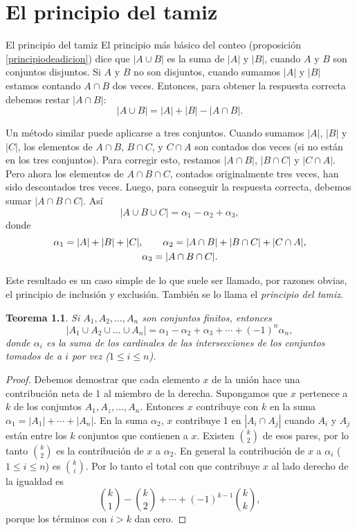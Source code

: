 \documentclass[11pt,spanish,makeidx]{amsbook}
\newtheorem{teorema}{Teorema}[section]
\theoremstyle{definition}
\theoremstyle{remark}
\begin{document}
\appendix
\setcounter{chapter}{1}
\renewcommand{\thechapter}{\Alph{chapter}}
\chapter[El principio del tamiz]{El principio del tamiz} \label{principiodeltamiz}

\begin{section}{El principio del tamiz}\label{Ap1.2}
El principio más básico del conteo (proposición \ref{principiodeadicion}) dice que $|A \cup B|$ es la suma de $|A|$ y $|B|$, cuando $A$ y $B$ son conjuntos
disjuntos. Si $A$ y $B$ no son disjuntos, cuando sumamos $|A|$ y $|B|$ estamos contando $A \cap B$ dos veces. Entonces, para obtener la respuesta correcta debemos restar $|A \cap B|$:
$$
|A \cup B| = |A|+|B| - |A \cap B|.
$$

Un método similar puede aplicarse a tres conjuntos. Cuando sumamos $|A|$, $|B|$ y $|C|$, los elementos de $A \cap B$, $B \cap C$, y $C \cap A$ son contados dos veces (si no están en los tres
conjuntos). Para corregir esto, restamos $|A \cap B|$, $|B \cap C|$ y $|C \cap A|$. Pero ahora los elementos de $A \cap B \cap C$, contados originalmente tres veces, han sido descontados tres
veces. Luego, para conseguir la respuesta correcta, debemos sumar $|A \cap B \cap C|$. Así
$$
|A \cup B\cup C|= \alpha_1-\alpha_2+\alpha_3,
$$ 
donde
$$\gathered
\alpha_1=|A|+|B|+|C|,\qquad \alpha_2= |A \cap B|+|B \cap C|+|C \cap A|, \\
\alpha_3 = |A \cap B \cap C|.
\endgathered
$$

Este resultado es un caso simple de lo que suele ser llamado, por razones obvias, el principio de inclusión y exclusión. También
 se lo llama el { \it principio del tamiz}.  

\begin{teorema}\label{tA1.2} Si $A_1,A_2,\ldots,A_n$ son conjuntos finitos, entonces
$$ |A_1 \cup A_2 \cup \ldots \cup A_n|= \alpha_1-\alpha_2+\alpha_3 + \cdots +(-1)^n\alpha_n, $$ donde $\alpha_i$ es la suma de los 
cardinales de las intersecciones de los conjuntos tomados de a $i$ por vez ($1 \le i \le n$).
\end{teorema}
\begin{proof} Debemos demostrar que cada elemento $x$ de la unión hace una contribución neta de 1 al miembro de la derecha.
Supongamos que $x$ pertenece a $k$ de los conjuntos $A_1, A_z,\ldots,A_n$. Entonces $x$ contribuye con $k$ en la suma $\alpha_1=|A_1|+\cdots+|A_n|$. En la suma $\alpha_2$, $x$ contribuye 1 en $|A_i \cap A_j|$ cuando $A_i$ y $A_j$ están entre los $k$ conjuntos que contienen a $x$. Existen $\binom{k}{2}$ de esos pares, por lo tanto $\binom{k}{2}$ es la contribución de $x$ a $\alpha_2$. En general la contribución de $x$ a $\alpha_i$ ($1 \le i \le n$) es $\binom{k}{i}$. Por lo tanto el total con que contribuye $x$ al lado derecho de la igualdad es 
$$
\binom{k}{1} -\binom{k}{2} + \cdots + (-1)^{k-1} \binom{k}{k},
$$
porque los términos con $i > k$ dan cero.


\end{proof}
\end{section}
\end{document}
